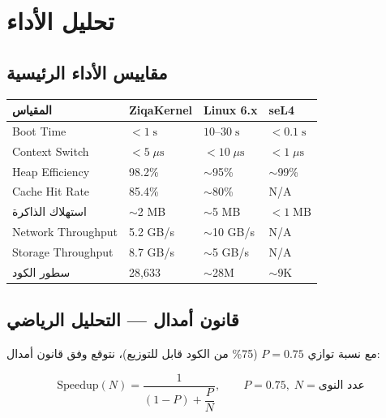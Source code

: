 \documentclass[12pt,a4paper]{article}
\theoremstyle{definition}
\newcommand{\en}[1]{\textenglish{#1}}
\begin{document}
\section{تحليل الأداء}\label{sec:perf}

\subsection{مقاييس الأداء الرئيسية}

\begin{center}
\begin{tabular}{L{4cm}C{3cm}C{3cm}C{3cm}}
\toprule
{}
\bfseries\color{white}\textarabic{المقياس} &
\bfseries\color{white}\textarabic{ZiqaKernel} &
\bfseries\color{white}\textarabic{Linux 6.x} &
\bfseries\color{white}\textarabic{seL4} \\
\midrule
{} Boot Time & $< 1\;\mathrm{s}$ & $10$--$30\;\mathrm{s}$ & $< 0.1\;\mathrm{s}$ \\
Context Switch & $< 5\;\mu\mathrm{s}$ & $< 10\;\mu\mathrm{s}$ & $< 1\;\mu\mathrm{s}$ \\
 Heap Efficiency & \en{98.2\%} & $\sim$\en{95\%} & $\sim$\en{99\%} \\
Cache Hit Rate & \en{85.4\%} & $\sim$\en{80\%} & N/A \\
 استهلاك الذاكرة & $\sim$2 \en{MB} & $\sim$5 \en{MB} & $< 1\;\mathrm{MB}$ \\
\en{Network} Throughput & 5.2 \en{GB/s} & $\sim$10 \en{GB/s} & N/A \\
 Storage Throughput & 8.7 \en{GB/s} & $\sim$5 \en{GB/s} & N/A \\
سطور الكود & 28,633 & $\sim$28M & $\sim$9K \\
\bottomrule
\end{tabular}
\end{center}

\subsection{قانون أمدال --- التحليل الرياضي}

مع نسبة توازي $P = 0.75$ (\en{75\%} من الكود قابل للتوزيع)، نتوقع وفق قانون أمدال:

\begin{equation}
\mathrm{Speedup}(N) = \frac{1}{(1-P) + \dfrac{P}{N}},\qquad P = 0.75,\; N = \text{عدد النوى}
\end{equation}
\end{document}
